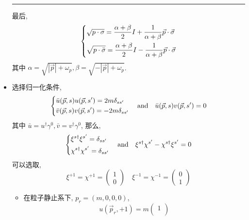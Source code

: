 \begin{itemize}
\begin{tcolorbox}[title=proof:]
		\noindent\rule[0.5ex]{\linewidth}{0.5pt} %
		
		最后,
		\begin{equation}
			\begin{dcases}
				\sqrt{p \cdot \sigma} = \frac{\alpha + \beta}{2} I + \frac{1}{\alpha + \beta} \vec{p} \cdot \vec{\sigma} \\
				\sqrt{p \cdot \bar{\sigma}} = \frac{\alpha + \beta}{2} I - \frac{1}{\alpha + \beta} \vec{p} \cdot \vec{\sigma}
			\end{dcases}
		\end{equation}
		其中 $\alpha = \sqrt{|\vec{p}| + \omega_p}, \beta = \sqrt{- |\vec{p}| + \omega_p}$.
	\end{tcolorbox}
	
	\item 选择归一化条件,
	\begin{equation}
		\begin{dcases}
			\bar{u}(\vec{p}, s) u(\vec{p}, s') = 2 m \delta_{s s'} \\
			\bar{v}(\vec{p}, s) v(\vec{p}, s') = - 2 m \delta_{s s'}
		\end{dcases} \quad \text{and} \quad \bar{u}(\vec{p}, s) v(\vec{p}, s') = 0
	\end{equation}
	其中 $\bar{u} = u^\dag \gamma^0, \bar{v} = v^\dag \gamma^0$, 那么,
	\begin{equation}
		\begin{dcases}
			\xi^{s \dag} \xi^{s'} = \delta_{s s'} \\
			\chi^{s \dag} \chi^{s'} = \delta_{s s'}
		\end{dcases} \quad \text{and} \quad \xi^{s \dag} \chi^{s'} - \chi^{s \dag} \xi^{s'} = 0
	\end{equation}
	可以选取,
	\begin{equation}
		\xi^{+ 1} = \chi^{+ 1} = \begin{pmatrix}
			1 \\
			0
		\end{pmatrix} \quad \xi^{- 1} = \chi^{- 1} = \begin{pmatrix}
			0 \\
			1
		\end{pmatrix}
	\end{equation}
	\begin{itemize}
		\item 在粒子静止系下, $p_r = (m, 0, 0, 0)$,
		\begin{equation}
			u(\vec{p}_r, + 1) = m \begin{pmatrix}
				1 \\

\end{pmatrix}
\end{equation}
\end{itemize}
\end{itemize}
